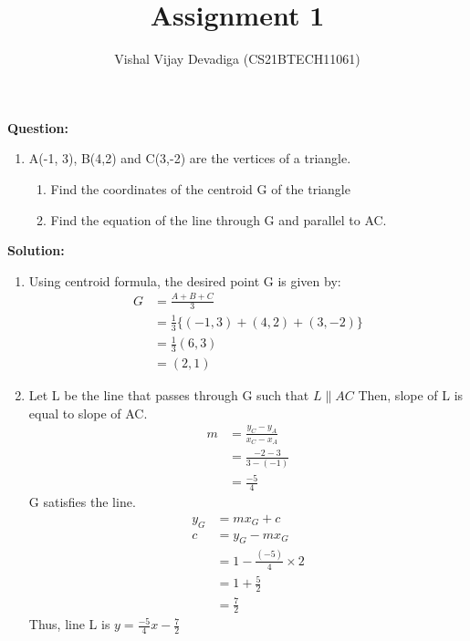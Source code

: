 \documentclass[12pt, a4paper]{article}
\newcommand{\solution}{\noindent \textbf{Solution: }}
\newcommand{\question}{\noindent \textbf{Question: }}
\begin{document}
\title{Assignment 1}
\author{Vishal Vijay Devadiga (CS21BTECH11061)}
\maketitle
\question
\begin{enumerate}[label=]
\item A(-1, 3), B(4,2) and C(3,-2) are the vertices of a triangle.
\begin{enumerate}
    \item Find the coordinates of the centroid G of the triangle
    \item Find the equation of the line through G and parallel to AC.
\end{enumerate}
\end{enumerate}
\solution
\begin{enumerate}
\item Using centroid formula,
    the desired point G is given by:
    \begin{align*}
        G&= \frac{A + B + C}{3}
        \\
        &= \frac{1}{3}\{(-1,3)+(4,2)+(3,-2)\}
        \\
        &=\frac{1}{3}(6,3)
        \\
        &=(2,1)
    \end{align*}
\item Let L be the line that passes through G such that $L \parallel AC$
    Then, slope of L is equal to slope of AC.
    \begin{align*}
        m&= \frac{y_C - y_A}{x_C - x_A}
        \\
        &= \frac{-2 - 3}{3 - (-1)}
        \\
        &=\frac{-5}{4}
    \end{align*}
    G satisfies the line.
    \begin{align*}
        y_G&= mx_G + c
        \\
        c&= y_G - mx_G
        \\
        &= 1 - \frac{(-5)}{4} \times 2
        \\
        &= 1 + \frac{5}{2}
        \\
        &= \frac{7}{2}
    \end{align*}
    Thus, line L is $y = \frac{-5}{4}x - \frac{7}{2}$
\end{enumerate}
\end{document}
